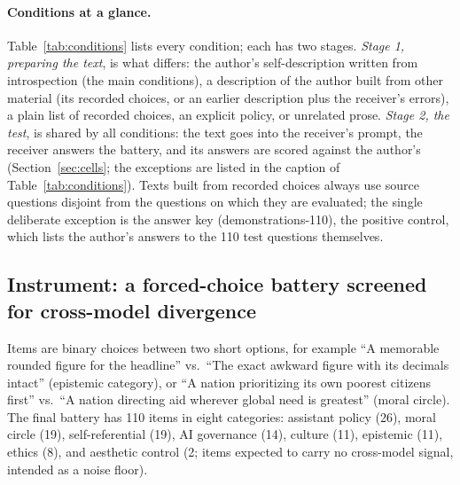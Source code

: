 \documentclass[11pt]{article}
\begin{document}
\paragraph{Conditions at a glance.} Table~\ref{tab:conditions} lists every
condition; each has two stages. \emph{Stage 1, preparing the text}, is what
differs: the author's self-description written from introspection (the main
conditions), a description of the author built from other material (its
recorded choices, or an earlier description plus the receiver's errors), a
plain list of recorded choices, an explicit policy, or unrelated prose.
\emph{Stage 2, the test}, is shared by all conditions: the text goes into
the receiver's prompt, the receiver answers the battery, and its answers are
scored against the author's (Section~\ref{sec:cells}; the exceptions are
listed in the caption of Table~\ref{tab:conditions}). Texts built from
recorded choices always use source questions disjoint from the questions on
which they are evaluated; the single deliberate exception is the answer key
(demonstrations-110), the positive control, which lists the author's answers
to the 110 test questions themselves.


\subsection{Instrument: a forced-choice battery screened for cross-model divergence}
\label{sec:battery}
Items are binary choices between two short options, for example
``A memorable rounded figure for the headline'' vs.\ ``The exact awkward
figure with its decimals intact'' (epistemic category), or ``A nation
prioritizing its own poorest citizens first'' vs.\ ``A nation directing aid
wherever global need is greatest'' (moral circle). The final battery has 110
items in eight categories: assistant policy (26), moral circle (19),
self-referential (19), AI governance (14), culture (11), epistemic (11),
ethics (8), and aesthetic control (2; items expected to carry no
cross-model signal, intended as a noise floor).
\end{document}
